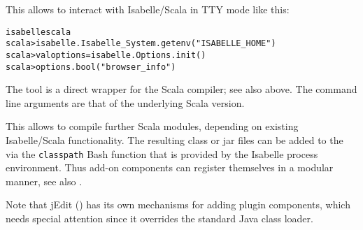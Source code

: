 \begin{isabellebody}
\begin{isamarkuptext}
  This allows to interact with Isabelle/Scala in TTY mode like this:
\begin{alltt}
  isabelle scala
  scala> isabelle.Isabelle_System.getenv("ISABELLE_HOME")
  scala> val options = isabelle.Options.init()
  scala> options.bool("browser_info")
\end{alltt}%
\end{isamarkuptext}%
\isamarkuptrue%
%
\isamarkuptrue%
%
\begin{isamarkuptext}%
The \hypertarget{tool.scalac}{\hyperlink{tool.scalac}{\mbox{}}} tool is a direct wrapper for the Scala
  compiler; see also \hyperlink{tool.scala}{\mbox{}} above.  The command line arguments
  are that of the underlying Scala version.

  This allows to compile further Scala modules, depending on existing
  Isabelle/Scala functionality.  The resulting class or jar files can
  be added to the \hyperlink{setting.CLASSPATH}{\mbox{}} via the \verb|classpath|
  Bash function that is provided by the Isabelle process environment.
  Thus add-on components can register themselves in a modular manner,
  see also .

  Note that jEdit () has its own mechanisms for
  adding plugin components, which needs special attention since
  it overrides the standard Java class loader.%
\end{isamarkuptext}%
\isamarkuptrue%
%
\isadelimtheory
%
\endisadelimtheory
%
\isatagtheory
{}\isamarkupfalse%
%
\endisatagtheory
{\isafoldtheory}%
%
\isadelimtheory
%
\endisadelimtheory
\isanewline
\end{isabellebody}%
